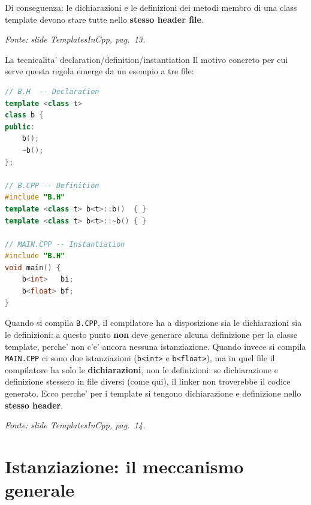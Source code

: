 \documentclass{report}
\newcommand{\code}[1]{\texttt{\small #1}}
\newcommand{\fonteslide}[1]{{\footnotesize\itshape\color{gray} Fonte: slide \emph{TemplatesInCpp}, pag.~#1.\par}}
\begin{document}

Di conseguenza: le dichiarazioni e le definizioni dei metodi membro di una
class template devono stare tutte nello \textbf{stesso header file}.

\fonteslide{13}

\begin{Example}{La tecnicalita' declaration/definition/instantiation}{}
Il motivo concreto per cui serve questa regola emerge da un esempio a tre
file:
\begin{lstlisting}[language=C++]
// B.H  -- Declaration
template <class t>
class b {
public:
    b();
    ~b();
};

// B.CPP -- Definition
#include "B.H"
template <class t> b<t>::b()  { }
template <class t> b<t>::~b() { }

// MAIN.CPP -- Instantiation
#include "B.H"
void main() {
    b<int>   bi;
    b<float> bf;
}
\end{lstlisting}
Quando si compila \code{B.CPP}, il compilatore ha a disposizione sia le
dichiarazioni sia le definizioni: a questo punto \textbf{non} deve generare
alcuna definizione per la classe template, perche' non c'e' ancora nessuna
istanziazione. Quando invece si compila \code{MAIN.CPP} ci sono due
istanziazioni (\code{b<int>} e \code{b<float>}), ma in quel file il
compilatore ha solo le \textbf{dichiarazioni}, non le definizioni: se
dichiarazione e definizione stessero in file diversi (come qui), il linker
non troverebbe il codice generato. Ecco perche' per i template si tengono
dichiarazione e definizione nello \textbf{stesso header}.
\end{Example}

\fonteslide{14}

\section{Istanziazione: il meccanismo generale}

\end{document}
